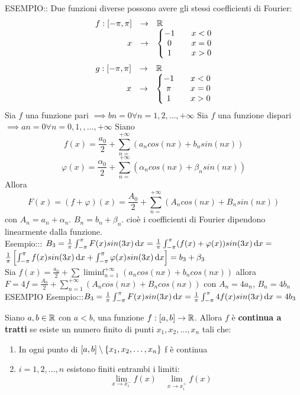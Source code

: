 ESEMPIO:: Due funzioni diverse possono avere gli stessi coefficienti di Fourier:
\[\begin{array}{rcl} f: \left[-\pi,\pi\right] & \to &  \mathbb{R} \\
x & \to & \left\{\begin{matrix} -1 && x<0\\0&&x= 0\\1&&x>0 \end{matrix}\right.\end{array}\]
\[\begin{array}{rcl} g: \left[-\pi,\pi\right] & \to &  \mathbb{R} \\
x & \to & \left\{\begin{matrix} -1 && x<0\\\pi&&x= 0\\1&&x>0 \end{matrix}\right.\end{array}\]
\observation
Sia $f$ una funzione pari $\implies bn=0 \forall n=1,2,\dotsc,+\infty$
\observation
Sia $f$ una funzione dispari $\implies an=0 \forall n=0,1,,\dotsc,+\infty$
\observation
Siano
\[f(x)=\frac{a_0}{2}+\sum\limits_{n=}^{+\infty}\left(a_ncos(nx)+b_nsin(nx)\right)\]
\[\varphi(x)=\frac{\alpha_0}{2}+\sum\limits_{n=}^{+\infty}\left(\alpha_ncos(nx)+\beta_nsin(nx)\right)\]
Allora
\[ F(x)=(f+\varphi)(x)=\frac{A_0}{2}+\sum\limits_{n=}^{+\infty}\left(A_ncos(nx)+B_nsin(nx)\right)\]
con $A_n=a_n+\alpha_n$. $B_n=b_n+\beta_n$.
cioè i coefficienti di Fourier dipendono linearmente dalla funzione.\\
Esempio::: $B_3=\frac{1}{\pi}\int_{-\pi}^{\pi}F(x)sin(3x)\,\mathrm{d}{x}=\frac{1}{\pi}\int_{-\pi}^{\pi}(f(x)+\varphi(x))sin(3x)\,\mathrm{d}{x}=$\\
$\frac{1}{\pi}\left[\int_{-\pi}^{\pi}f(x)sin(3x)\,\mathrm{d}{x}+\int_{-\pi}^{\pi}\varphi(x)sin(3x)\,\mathrm{d}{x}\right]=b_3+\beta_3$\\
Sia $f(x)=\frac{a_0}{2}+\sum\liminf_{n=1}^{+\infty}\left(a_ncos(nx)+b_ncos(nx)\right)$ allora $F=4f=\frac{A_0}{2}+\sum\limits_{n=1}^{+\infty}\left(A_ncos(nx)+B_ncos(nx)\right)$ con $A_n=4a_n$, $B_n=4b_n$\\
ESEMPIO
Esempio:::$B_3=\frac{1}{\pi}\int_{-\pi}^{\pi}F(x)sin(3x)\,\mathrm{d}{x}=\frac{1}{\pi}\int_{-\pi}^{\pi}4f(x)sin(3x)\,\mathrm{d}{x}=4b_3$\\
\begin{definition}
	Siano $a,b\in \mathbb{R}$ con $a<b$, una funzione $f:\left[a,b\right] \to \mathbb{R}$. Allora $f$ è \textbf{continua a tratti} se esiste un numero finito di punti $x_1,x_2,\dotsc,x_n$ tali che:
	\begin{enumerate}
		\item In ogni punto di $\left[a,b\right]\setminus\left\{x_1,x_2,\dotsc,x_n\right\}$ f è continua
		\item $i=1,2,\dotsc,n$ esistono finiti entrambi i limiti:
		\[\lim\limits_{x\to x_i^{-}}f(x)\quad \lim\limits_{x\to x_i^{+}}f(x)\]
	\end{enumerate}
\end{definition}

